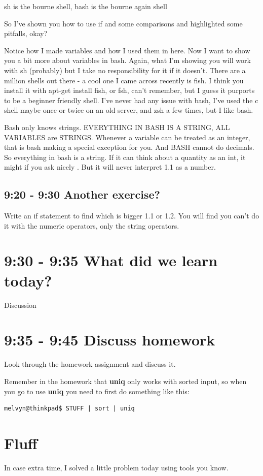 \documentclass[10pt]{article}
\begin{document}
sh is the bourne shell, bash is the bourne again shell

So I've shown you how to use if and some comparisons and highlighted some pitfalls, okay?

Notice how I made variables and how I used them in here. Now I want to show you a bit more about variables in bash. Again, what I'm showing you will work with sh (probably) but I take no responsibility for it if it doesn't. There are a million shells out there - a cool one I came across recently is fish. I think you install it with apt-get install fish, or fsh, can't remember, but I guess it purports to be a beginner friendly shell. I've never had any issue with bash, I've used the c shell maybe once or twice on an old server, and zsh a few times, but I like bash.

Bash only knows strings. EVERYTHING IN BASH IS A STRING, ALL VARIABLES are
STRINGS. Whenever a variable can be treated as an integer, that is bash making a
special exception for you. And BASH cannot do decimals. So everything in bash is
a string. If it can think about a quantity as an int, it might if you ask nicely
. But it will never interpret 1.1 as a number. 

\subsection{9:20 - 9:30 Another exercise?}
Write an if statement to find which is bigger 1.1 or 1.2. You will find you
can't do it with the numeric operators, only the string operators.

\section{9:30 - 9:35 What did we learn today?}
Discussion


\section{9:35 - 9:45 Discuss homework}
Look through the homework assignment and discuss it.

Remember in the homework that \textbf{uniq} only works with sorted input, so
when you go to use \textbf{uniq} you need to first do something like this:

\begin{lstlisting}[style=term]
melvyn@thinkpad$ STUFF | sort | uniq
\end{lstlisting}

\section{Fluff}
In case extra time, I solved a little problem today using tools you know.
\end{document}
